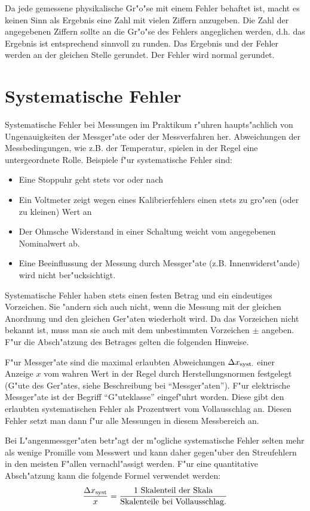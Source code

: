 Da jede gemessene physikalische Gr"o"se mit einem Fehler behaftet ist,
macht es keinen Sinn als Ergebnis eine Zahl mit vielen Ziffern
anzugeben. Die Zahl der angegebenen Ziffern sollte an die Gr"o"se des
Fehlers angeglichen werden, d.h. das Ergebnis ist entsprechend
sinnvoll zu runden. Das Ergebnis und der Fehler werden an der
gleichen Stelle gerundet. Der Fehler wird normal gerundet.


\section{Systematische Fehler}

Systematische Fehler bei Messungen im
Praktikum r"uhren haupts"achlich von Ungenauigkeiten der Messger"ate
oder der Messverfahren her. Abweichungen der Messbedingungen, wie
z.B. der Temperatur, spielen in der Regel eine untergeordnete
Rolle. Beispiele f"ur systematische Fehler sind:
%
\begin{itemize}
  \item Eine Stoppuhr geht stets vor oder nach
  \item Ein Voltmeter zeigt wegen eines Kalibrierfehlers einen stets zu gro"sen
   (oder zu kleinen) Wert an
  \item Der Ohmsche Widerstand in einer Schaltung weicht vom
  angegebenen Nominalwert ab.
  \item Eine Beeinflussung der Messung durch Messger"ate (z.B.
  Innenwiderst"ande) wird nicht ber"ucksichtigt.
\end{itemize}
%
Systematische Fehler haben stets einen festen Betrag und ein
eindeutiges Vorzeichen. Sie "andern sich auch nicht, wenn die Messung
mit der gleichen Anordnung und den gleichen Ger"aten wiederholt wird.
Da das Vorzeichen nicht bekannt ist, muss man sie auch mit dem
unbestimmten Vorzeichen $\pm$ angeben. F"ur die Absch"atzung des
Betrages gelten die folgenden Hinweise.

F"ur Messger"ate sind die maximal erlaubten Abweichungen $\Delta
x_{\rm syst.}$ einer Anzeige $x$ vom wahren Wert in der Regel durch
Herstellungsnormen festgelegt (G"ute des Ger"ates, siehe
Beschreibung bei "`Messger"aten"'). F"ur elektrische Messger"ate ist
der Begriff "`G"uteklasse"' eingef"uhrt worden. Diese gibt den
erlaubten systematischen Fehler als Prozentwert vom Vollausschlag
an. Diesen Fehler setzt man dann f"ur alle Messungen in diesem
Messbereich an.

Bei L"angenmessger"aten betr"agt der m"ogliche systematische Fehler
selten mehr als wenige Promille vom Messwert und kann daher
gegen"uber den Streufehlern in den meisten F"allen vernachl"assigt
werden. F"ur eine quantitative Absch"atzung kann die folgende Formel
verwendet werden:
%
\begin{equation}\label{e:skalafehler}
  \frac{\Delta x_{\rm syst}}{x} =
  \frac{\mbox{1 Skalenteil der Skala}}{\mbox{Skalenteile bei Vollausschlag.}}
\end{equation}


